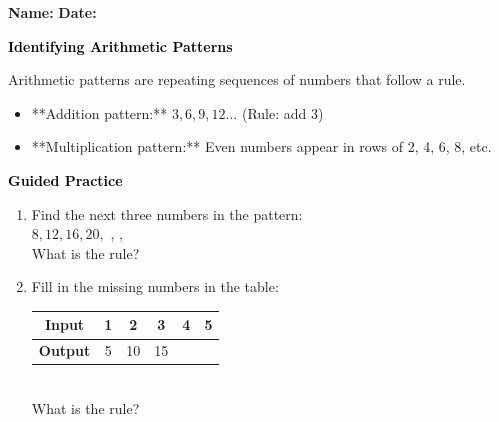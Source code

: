 \documentclass[12pt, letterpaper, fleqn]{article}
\newcommand{\blank}{\underline{\hspace{2.2cm}}}
\newcommand{\blanklong}{\underline{\hspace{6.5cm}}}
\begin{document}
\textbf{Name:} \underline{\hspace{5cm}}
\hfill
\textbf{Date:} \underline{\hspace{3cm}}\\

\begin{tcolorbox}[colback=customteal!20]
    \large\textcolor{black}{\textbf{Identifying Arithmetic Patterns}}
\end{tcolorbox}

\vspace{3mm}
\noindent
Arithmetic patterns are repeating sequences of numbers that follow a rule.
\begin{itemize}
  \item **Addition pattern:** $3, 6, 9, 12 \dots$ (Rule: add 3)
  \item **Multiplication pattern:** Even numbers appear in rows of 2, 4, 6, 8, etc.
\end{itemize}

\newpage
\begin{tcolorbox}[colback=customteal!20]
    \large\textcolor{black}{\textbf{Guided Practice}}
\end{tcolorbox}

\vspace{5mm}
\begin{enumerate}[itemsep=2.5cm, leftmargin=0.6cm]
\item Find the next three numbers in the pattern:
\\
$8, 12, 16, 20,$ \blank, \blank, \blank \\
What is the rule? \blanklong

\item Fill in the missing numbers in the table:
\\
\begin{tabular}{|c|c|c|c|c|c|}
\hline
\textbf{Input} & 1 & 2 & 3 & 4 & 5 \\ \hline
\textbf{Output} & 5 & 10 & 15 & \blank & \blank \\ \hline
\end{tabular}
\\
What is the rule? \blanklong
\end{enumerate}
\end{document}
